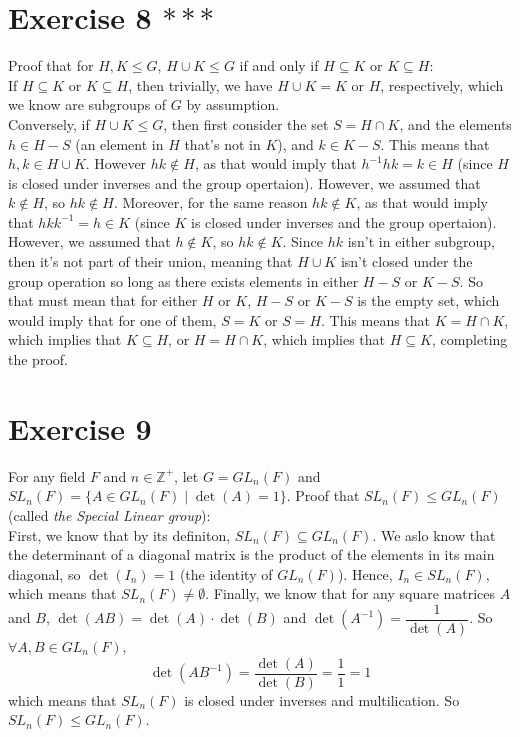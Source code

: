 \documentclass[12pt]{article}
\newcommand{\Z}{\mathbb{Z}}
\begin{document}
    \section*{Exercise 8 $***$}
    Proof that for $H, K \leqslant G$,
    $H \cup K \leqslant G$
    if and only if $H \subseteq K$ or  $K \subseteq H$: \\
    If $H \subseteq K$ or $K \subseteq H$,
    then trivially, we have $H \cup K = K$ or $H$, respectively,
    which we know are subgroups of $G$ by assumption. \\
    Conversely, if $H \cup K \leqslant G$,
    then first consider the set $S = H \cap K$,
    and the elements $h \in H - S$
    (an element in $H$ that's not in $K$),
    and $k \in K - S$.
    This means that $h, k \in H \cup K$.
    However $hk \notin H$,
    as that would imply that $h^{-1}hk = k \in H$
    (since $H$ is closed under inverses and the group opertaion).
    However, we assumed that $k \notin H$,
    so $hk \notin H$.
    Moreover, for the same reason $hk \notin K$,
    as that would imply that $hkk^{-1} = h \in K$
    (since $K$ is closed under inverses and the group opertaion).
    However, we assumed that $h \notin K$,
    so $hk \notin K$.
    Since $hk$ isn't in either subgroup,
    then it's not part of their union, meaning that $H \cup K$
    isn't closed under the group operation so long as
    there exists elements in either $H - S$ or $K - S$.
    So that must mean that for either $H$ or $K$,
    $H - S$ or $K - S$ is the empty set,
    which would imply that for one of them, $S = K$ or $S = H$.
    This means that $K = H \cap K$,
    which implies that $K \subseteq H$,
    or $H = H \cap K$,
    which implies that $H \subseteq K$,
    completing the proof.


    \section*{Exercise 9}
    For any field $F$ and $n \in \Z^+$,
    let $G = GL_n(F)$ and $SL_n(F) = \{A \in GL_n(F) \mid \det(A) = 1\}$.
    Proof that $SL_n(F) \leqslant GL_n(F)$
    (called \textit{the Special Linear group}): \\
    First, we know that by its definiton, $SL_n(F) \subseteq GL_n(F)$.
    We aslo know that the determinant of a diagonal matrix is the product
    of the elements in its main diagonal,
    so $\det(I_n) = 1$ (the identity of $GL_n(F)$).
    Hence, $I_n \in SL_n(F)$,
    which means that $SL_n(F) \neq \emptyset$.
    Finally, we know that for any square matrices $A$ and $B$,
    $\det(AB) = \det(A) \cdot \det(B)$
    and $\det(A^{-1}) = \dfrac{1}{\det(A)}$.
    So $\forall A, B \in GL_n(F)$,
    \[\det(AB^{-1}) = \dfrac{\det(A)}{\det(B)} = \dfrac{1}{1} = 1\]
    which means that $SL_n(F)$ is closed under inverses and multilication.
    So $SL_n(F) \leqslant GL_n(F)$.
\end{document}
